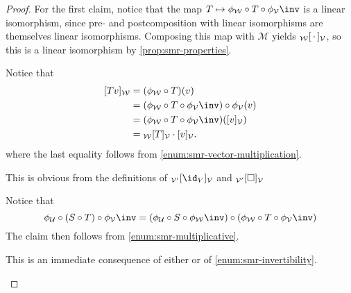 \documentclass[article, a4paper, 11pt, oneside]{memoir}
\numberwithin{equation}{chapter}
\newcommand{\calM}{\mathcal{M}}
\newcommand{\calV}{\mathcal{V}}
\newcommand{\calW}{\mathcal{W}}
\newcommand{\calU}{\mathcal{U}}
\begin{document}
\begin{proof}
    For the first claim, notice that the map $T \mapsto \coordmap{\calW} \circ T \circ \coordmap{\calV}\inv$ is a linear isomorphism, since pre- and postcomposition with linear isomorphisms are themselves linear isomorphisms. Composing this map with $\calM$ yields $\mr{\calW}{\,\cdot\,}{\calV}$, so this is a linear isomorphism by \cref{prop:smr-properties}.
    \begin{proofsec}
        \item[Proof of \subcref{enum:mr-vector-multiplication}]
        Notice that
        \begin{align*}
            \coordvec{Tv}{\calW}
                &= (\coordmap{\calW} \circ T)(v) \\
                &= (\coordmap{\calW} \circ T \circ \coordmap{\calV}\inv) \circ \coordmap{\calV}(v) \\
                &= (\coordmap{\calW} \circ T \circ \coordmap{\calV}\inv)(\coordvec{v}{\calV}) \\
                &= \mr{\calW}{T}{\calV} \cdot \coordvec{v}{\calV}.
        \end{align*}
        where the last equality follows from \cref{enum:smr-vector-multiplication}.

        \item[Proof of \subcref{enum:mr-of-identity-map}]
        This is obvious from the definitions of $\mr{\calV'}{\id_V}{\calV}$ and $\basischangemat{\calV'}{\calV}$

        \item[Proof of \subcref{enum:mr-multiplicative}]
        Notice that
        \begin{equation*}
            \coordmap{\calU} \circ (S \circ T) \circ \coordmap{\calV}\inv
                = (\coordmap{\calU} \circ S \circ \coordmap{\calW}\inv) \circ (\coordmap{\calW} \circ T \circ \coordmap{\calV}\inv)
        \end{equation*}
        The claim then follows from \cref{enum:smr-multiplicative}.

        \item[Proof of \subcref{enum:mr-invertibility}]
        This is an immediate consequence of either  or of \cref{enum:smr-invertibility}.
    \end{proofsec}
\end{proof}
\end{document}

